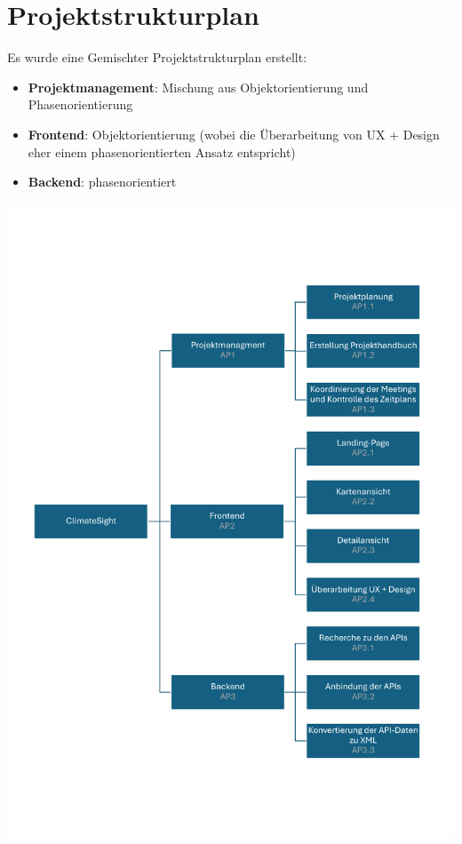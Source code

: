 \documentclass[12pt]{article}
\begin{document}
\section{Projektstrukturplan}
Es wurde eine Gemischter Projektstrukturplan erstellt:
\begin{itemize}
	\item {\bf Projektmanagement}: Mischung aus Objektorientierung und Phasenorientierung
	\item {\bf Frontend}: Objektorientierung (wobei die Überarbeitung von UX + Design eher einem phasenorientierten Ansatz entspricht)
	\item {\bf Backend}: phasenorientiert
\end{itemize}
\includegraphics[width=\textwidth]{Planungsdokumente/graphics/Projektstrukturplan.pdf}
\end{document}
